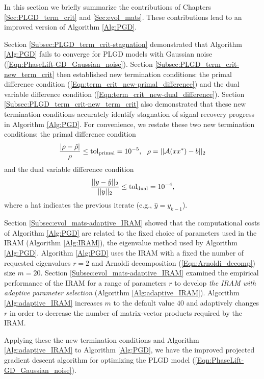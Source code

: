 In this section we briefly summarize the contributions of Chapters \ref{Sec:PLGD_term_crit} and \ref{Sec:evol_mats}.  These contributions lead to an improved version of Algorithm \ref{Alg:PGD}.

Section \ref{Subsec:PLGD_term_crit-stagnation} demonstrated that Algorithm \ref{Alg:PGD} fails to converge for PLGD models with Gaussian noise (\ref{Eqn:PhaseLift-GD_Gaussian_noise}).
Section \ref{Subsec:PLGD_term_crit-new_term_crit} then established new termination conditions: the primal difference condition (\ref{Eqn:term_crit_new-primal_difference}) and the dual variable difference condition (\ref{Eqn:term_crit_new-dual_difference}).
Section \ref{Subsec:PLGD_term_crit-new_term_crit} also demonstrated that these new termination conditions accurately identify stagnation of signal recovery progress in Algorithm \ref{Alg:PGD}.
For convenience, we restate these two new termination conditions:
the primal difference condition
\begin{equation}
	\label{Eqn:term_crit_new-primal_difference2}
\frac{| \rho - \hat{\rho} |}{\rho} \leq  \textnormal{tol}_\textnormal{primal} = 10^{-5}, \ \ \rho = ||{\mathcal A}(xx^*) - b||_2
\end{equation}
and the dual variable difference condition
\begin{equation}
	\label{Eqn:term_crit_new-dual_difference2}
\frac{||y- \hat{y}||_2}{||y||_2} \leq \textnormal{tol}_\textnormal{dual}= 10^{-4},
\end{equation}
where a hat indicates the previous iterate (e.g., $\hat{y} = y_{k-1}$). 


Section \ref{Subsec:evol_mats-adaptive_IRAM} showed that the computational costs of Algorithm \ref{Alg:PGD} are related to the fixed choice of parameters used in the IRAM (Algorithm \ref{Alg:IRAM}), the eigenvalue method used by Algorithm \ref{Alg:PGD}.
Algorithm \ref{Alg:PGD} uses the IRAM with a fixed the number of requested eigenvalues $r = 2$ and Arnoldi decomposition (\ref{Eqn:Arnoldi_decomp}) size $m = 20$.
Section \ref{Subsec:evol_mats-adaptive_IRAM} examined the empirical performance of the IRAM for a range of parameters $r$ to develop \textit{the IRAM with adaptive parameter selection} (Algorithm \ref{Alg:adaptive_IRAM}).
Algorithm \ref{Alg:adaptive_IRAM} increases $m$ to the default value $40$ and adaptively changes $r$ in order to decrease the number of matrix-vector products required by the IRAM.


Applying these the new termination conditions and Algorithm \ref{Alg:adaptive_IRAM} to Algorithm \ref{Alg:PGD}, we have the improved projected gradient descent algorithm for optimizing the PLGD model (\ref{Eqn:PhaseLift-GD_Gaussian_noise}).

